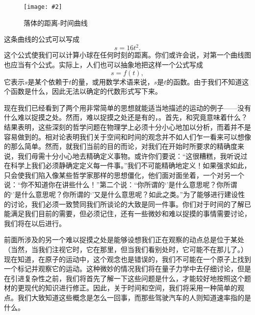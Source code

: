 \documentclass[12pt,oneside]{book}
\newenvironment{fig}[2][1]
{\begin{figure}[H]
\centering
\texttt{[image: \#2]}}
{\end{figure}}
\begin{document}
\begin{fig}{落体的距离-时间曲线}
\caption{落体的距离-时间曲线}
\label{fig:落体的距离-时间曲线}
\end{fig}



这条曲线的公式可以写成
\begin{equation}
\label{Eq:I:8:1}
s=16t^2.
\end{equation}
这个公式使我们可以计算小球在任何时刻的距离。你们或许会说，对第一个曲线图也应当有个公式。实际上，人们也可以抽象地把这样一个公式写成
\begin{equation}
\label{Eq:I:8:2}
s=f(t),
\end{equation}
它表示$s$是某个依赖于$t$的量，或用数学术语来说，$s$是$t$的函数。由于我们不知道这个函数是什么，因此无法以确定的代数形式写下来。

现在我们已经看到了两个用非常简单的思想就能适当地描述的运动的例子——没有什么难以捉摸之处。然而，难以捉摸之处还是有的，。首先，和究竟意味着什么？结果表明，这些深刻的哲学问题在物理学上必须十分小心地加以分析，而着并不是容易做到的。相对论表明我们关于空间和时间的观念并不如人们乍一看来可以想像的那么简单。然而，就我们当前的目的而论，对我们在开始时所要求的精确度来说，我们毋需十分小心地去精确定义事物。或许你们要说：“这很糟糕，我听说过在科学上我们必须静确定定义每一件事。”我们不可能精确地定义！如果强求如此，只会使我们陷入像某些哲学家那样的思想僵化，他们面对面坐着，一个对另一个说：“你不知道你在讲些什么！”第二个说：“你所谓的‘’是什么意思呢？你所谓的‘’是什么意思呢？你所谓的‘’又是什么意思呢？如此之类。”为了能够进行建设性的讨论，我们必须一致赞同我们所谈论的大致是同一件事。你们对于时间的了解已能满足我们目前的需要，但必须记住，还有一些微妙和难以捉摸的事情需要讨论，我们将在以后进行。

前面所涉及的另一个难以捉摸之处是能够设想我们正在观察的动点总是位于某处（当然，当我们注视它时，它在那里，但当我们看别处时，它可能不在那儿了。）现在知道，在原子的运动中，这个观念也是错误的，我们不可能在一个原子上找到一个标记并观察它的运动。这种微妙的情况我们将在量子力学中去仔细讨论，但是在引进复杂性之前，我们将首先了解一下这些问题是什么，才能较好地按照这个题材的更现代的知识进行修正。因此，关于时间和空间，我们将采用一种简单的观点。我们大致知道这些概念是怎么一回事，而那些驾驶汽车的人则知道速率指的是什么。
\end{document}
